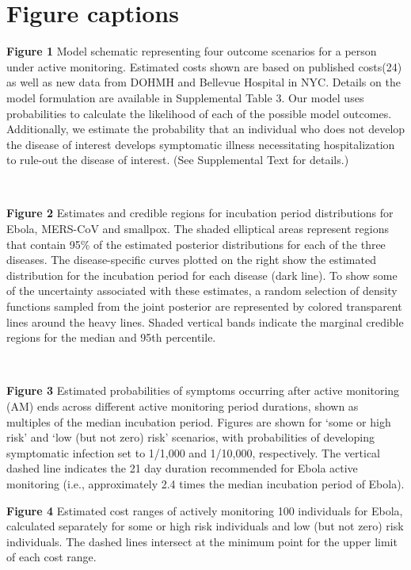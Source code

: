 \documentclass[]{article}
\begin{document}
\section{Figure captions}\label{figure-captions}

\textbf{Figure 1} Model schematic representing four outcome scenarios
for a person under active monitoring. Estimated costs shown are based on
published costs(24) as well as new data from DOHMH and Bellevue Hospital
in NYC. Details on the model formulation are available in Supplemental
Table 3. Our model uses probabilities to calculate the likelihood of
each of the possible model outcomes. Additionally, we estimate the
probability that an individual who does not develop the disease of
interest develops symptomatic illness necessitating hospitalization to
rule-out the disease of interest. (See Supplemental Text for details.)

~

\textbf{Figure 2} Estimates and credible regions for incubation period
distributions for Ebola, MERS-CoV and smallpox. The shaded elliptical
areas represent regions that contain 95\% of the estimated posterior
distributions for each of the three diseases. The disease-specific
curves plotted on the right show the estimated distribution for the
incubation period for each disease (dark line). To show some of the
uncertainty associated with these estimates, a random selection of
density functions sampled from the joint posterior are represented by
colored transparent lines around the heavy lines. Shaded vertical bands
indicate the marginal credible regions for the median and 95th
percentile.

~

\textbf{Figure 3} Estimated probabilities of symptoms occurring after
active monitoring (AM) ends across different active monitoring period
durations, shown as multiples of the median incubation period. Figures
are shown for `some or high risk' and `low (but not zero) risk'
scenarios, with probabilities of developing symptomatic infection set to
1/1,000 and 1/10,000, respectively. The vertical dashed line indicates
the 21 day duration recommended for Ebola active monitoring (i.e.,
approximately 2.4 times the median incubation period of Ebola).

\textbf{Figure 4} Estimated cost ranges of actively monitoring 100
individuals for Ebola, calculated separately for some or high risk
individuals and low (but not zero) risk individuals. The dashed lines
intersect at the minimum point for the upper limit of each cost range.
\end{document}
